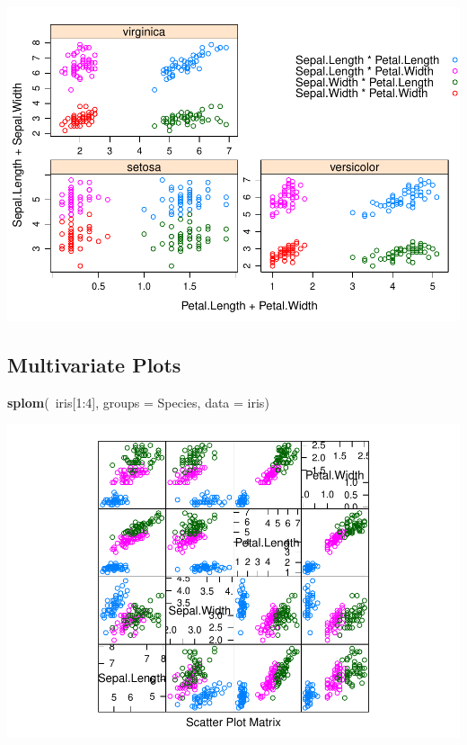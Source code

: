 \documentclass[]{article}
\newenvironment{Shaded}{\begin{snugshade}}{\end{snugshade}}
\newcommand{\KeywordTok}[1]{\textcolor[rgb]{0.13,0.29,0.53}{\textbf{{#1}}}}
\newcommand{\DataTypeTok}[1]{\textcolor[rgb]{0.13,0.29,0.53}{{#1}}}
\newcommand{\DecValTok}[1]{\textcolor[rgb]{0.00,0.00,0.81}{{#1}}}
\newcommand{\NormalTok}[1]{{#1}}
\begin{document}
\includegraphics{Intro_Datenanalyse1_files/figure-latex/unnamed-chunk-179-1.pdf}

\subsection{Multivariate Plots}\label{multivariate-plots}

\begin{Shaded}
\begin{Highlighting}[]
\KeywordTok{splom}\NormalTok{(~iris[}\DecValTok{1}\NormalTok{:}\DecValTok{4}\NormalTok{], }\DataTypeTok{groups =} \NormalTok{Species, }\DataTypeTok{data =} \NormalTok{iris)}
\end{Highlighting}
\end{Shaded}

\includegraphics{Intro_Datenanalyse1_files/figure-latex/unnamed-chunk-180-1.pdf}
\end{document}
